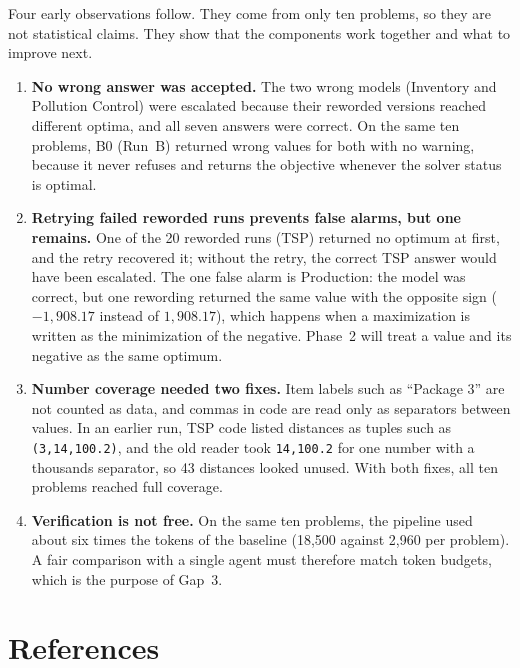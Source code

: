 \documentclass[11pt,a4paper]{article}
\begin{document}
\FloatBarrier
Four early observations follow. They come from only ten problems, so they are not statistical claims. They show that the components work together and what to improve next.
\begin{enumerate}[leftmargin=1.6em]
\item \textbf{No wrong answer was accepted.} The two wrong models (Inventory and Pollution Control) were escalated because their reworded versions reached different optima, and all seven answers were correct. On the same ten problems, B0 (Run~B) returned wrong values for both with no warning, because it never refuses and returns the objective whenever the solver status is optimal.
\item \textbf{Retrying failed reworded runs prevents false alarms, but one remains.} One of the 20 reworded runs (TSP) returned no optimum at first, and the retry recovered it; without the retry, the correct TSP answer would have been escalated. The one false alarm is Production: the model was correct, but one rewording returned the same value with the opposite sign ($-1{,}908.17$ instead of $1{,}908.17$), which happens when a maximization is written as the minimization of the negative. Phase~2 will treat a value and its negative as the same optimum.
\item \textbf{Number coverage needed two fixes.} Item labels such as ``Package 3'' are not counted as data, and commas in code are read only as separators between values. In an earlier run, TSP code listed distances as tuples such as \texttt{(3,14,100.2)}, and the old reader took \texttt{14,100.2} for one number with a thousands separator, so 43 distances looked unused. With both fixes, all ten problems reached full coverage.
\item \textbf{Verification is not free.} On the same ten problems, the pipeline used about six times the tokens of the baseline (18,500 against 2,960 per problem). A fair comparison with a single agent must therefore match token budgets, which is the purpose of Gap~3.
\end{enumerate}

\section*{References}
\end{document}
